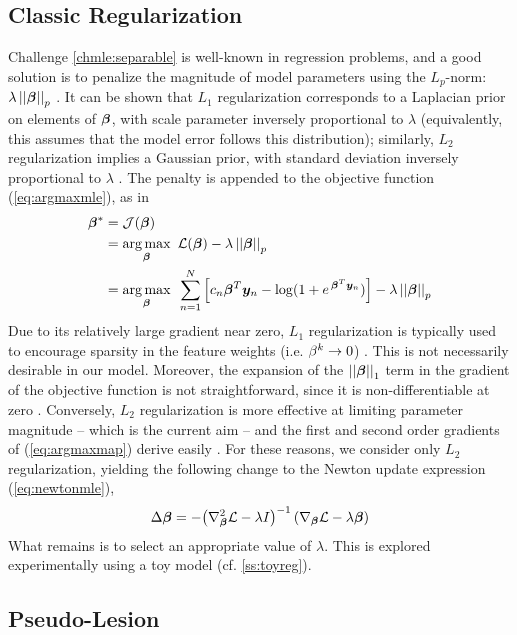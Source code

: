 \subsection{Classic Regularization}
Challenge \ref{chmle:separable} is well-known in regression problems, and a good solution is to penalize the magnitude of model parameters using the $L_p$-norm: $\lambda\left|\left|\bm{\beta}\right|\right|_p$ \cite{Zou2005}. It can be shown that $L_1$ regularization corresponds to a Laplacian prior on elements of $\bm{\beta}$, with scale parameter inversely proportional to $\lambda$ (equivalently, this assumes that the model error follows this distribution); similarly, $L_2$ regularization implies a Gaussian prior, with standard deviation inversely proportional to $\lambda$ \cite{Zou2005}. The penalty is appended to the objective function (\ref{eq:argmaxmle}), as in 
\begin{align}
\bm{\beta}^* &= \mathcal{J}(\bm{\beta})\nonumber\\
&= \underset{\bm{\beta}}{\arg\max}\enspace\mathcal{L}(\bm{\beta}) - \lambda\left|\left|\bm{\beta}\right|\right|_p \nonumber\\
&= \underset{\bm{\beta}}{\arg\max}\enspace\sum_{n=1}^{N} \Big[ c_n \bm{\beta}^T\bm{y}_n - \log (1+e^{\thinspace\bm{\beta}^T\bm{y}_n}) \Big] - \lambda\left|\left|\bm{\beta}\right|\right|_p
\label{eq:argmaxmap}
\end{align}
Due to its relatively large gradient near zero, $L_1$ regularization is typically used to encourage sparsity in the feature weights (i.e. $\beta^k\rightarrow0$) \cite{Tibshirani1996}. This is not necessarily desirable in our model. Moreover, the expansion of the $\left|\left|\bm{\beta}\right|\right|_1$ term in the gradient of the objective function is not straightforward, since it is non-differentiable at zero \cite{Tibshirani1996,Lee2006}. Conversely, $L_2$ regularization is more effective at limiting parameter magnitude -- which is the current aim -- and the first and second order gradients of (\ref{eq:argmaxmap}) derive easily \cite{Minka2003}. For these reasons, we consider only $L_2$ regularization, yielding the following change to the Newton update expression (\ref{eq:newtonmle}),
\begin{equation}
\Delta\bm{\beta} = -{\left(\nabla^2_{\bm{\beta}}\mathcal{L}-\lambda I\right)}^{-1}\left(\nabla_{\bm{\beta}}\mathcal{L}-\lambda\bm{\beta}\right)
\label{eq:newtonmap}
\end{equation}
What remains is to select an appropriate value of $\lambda$. This is explored experimentally using a toy model (cf. \ref{ss:toyreg}).
\subsection{Pseudo-Lesion}
%
%
%
%
%


